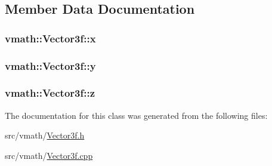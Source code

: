 \subsection{Member Data Documentation}
\hypertarget{classvmath_1_1Vector3f_adfc960779db8a0dd2f9670af4d075a4a}{
\subsubsection[{x}]{ {\bf vmath::Vector3f::x}}}
\label{classvmath_1_1Vector3f_adfc960779db8a0dd2f9670af4d075a4a}
\hypertarget{classvmath_1_1Vector3f_a22cb6b05462c55b6d5475d37dbc667f4}{
\subsubsection[{y}]{ {\bf vmath::Vector3f::y}}}
\label{classvmath_1_1Vector3f_a22cb6b05462c55b6d5475d37dbc667f4}
\hypertarget{classvmath_1_1Vector3f_ae4aaae3b4db7ef3c3e30d7c66cb9aa76}{
\subsubsection[{z}]{ {\bf vmath::Vector3f::z}}}
\label{classvmath_1_1Vector3f_ae4aaae3b4db7ef3c3e30d7c66cb9aa76}


The documentation for this class was generated from the following files:\begin{DoxyCompactItemize}
\item 
src/vmath/\hyperlink{Vector3f_8h}{Vector3f.h}\item 
src/vmath/\hyperlink{Vector3f_8cpp}{Vector3f.cpp}\end{DoxyCompactItemize}
